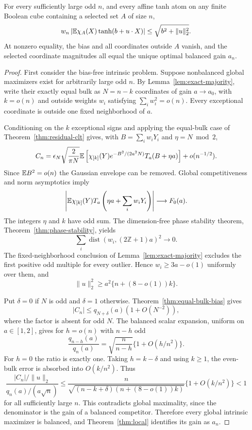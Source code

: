 \begin{theorem}
\label{thm:global-single-parity}
For every sufficiently large odd $n$, and every affine tanh atom on
any finite Boolean cube containing a selected set $A$ of size $n$,
\[
 w_n\left|\mathbb E\chi_A(X)\tanh(b+u\cdot X)\right|
 \le\sqrt{b^2+\|u\|_2^2}.
\]
At nonzero equality, the bias and all coordinates outside $A$ vanish,
and the selected coordinate magnitudes all equal the unique optimal
balanced gain $a_n$.
\end{theorem}
\begin{proof}
First consider the bias-free intrinsic problem. Suppose nonbalanced
global maximizers exist for arbitrarily large odd $n$. By
Lemma~\ref{lem:exact-majority}, write their exactly equal bulk as
$N=n-k$ coordinates of gain $a\to a_0$, with $k=o(n)$ and outside
weights $w_i$ satisfying $\sum_iw_i^2=o(n)$. Every exceptional
coordinate is outside one fixed neighborhood of $a$.

Conditioning on the $k$ exceptional signs and applying the equal-bulk
case of Theorem~\ref{thm:residual-clt} gives, with
$B=\sum_iw_iY_i$ and $\eta=N\bmod2$,
\[
 C_n=\epsilon_N\sqrt{\frac2{\pi N}}
 \mathbb E\left[\chi_{[k]}(Y)e^{-B^2/(2a^2N)}T_a(B+\eta a)\right]
 +o(n^{-1/2}).
\]
Since $\mathbb E B^2=o(n)$ the Gaussian envelope can be removed. Global
competitiveness and norm asymptotics imply
\[
 \left|\mathbb E\chi_{[k]}(Y)T_a\left(\eta a+\sum_iw_iY_i\right)\right|
 \longrightarrow F_0(a).
\]
The integers $\eta$ and $k$ have odd sum. The dimension-free phase
stability theorem, Theorem~\ref{thm:phase-stability}, yields
\[
 \sum_i\operatorname{dist}(w_i,(2\mathbb Z+1)a)^2\longrightarrow0.
\]
The fixed-neighborhood conclusion of Lemma~\ref{lem:exact-majority}
excludes the first positive odd multiple for every outlier. Hence
$w_i\ge3a-o(1)$ uniformly over them, and
\begin{equation}\label{eq:exception-norm-inflation}
 \|u\|_2^2\ge a^2\{n+(8-o(1))k\}.
\end{equation}

Put $\delta=0$ if $N$ is odd and $\delta=1$ otherwise.
Theorem~\ref{thm:equal-bulk-bias} gives
\[
 |C_n|\le q_{N+\delta}(a)(1+O(N^{-2})),
\]
where the factor is absent for odd $N$. The balanced scalar expansion,
uniform on $a\in[1,2]$, gives for $h=o(n)$ with $n-h$ odd
\[
 \frac{q_{n-h}(a)}{q_n(a)}
 =\sqrt{\frac n{n-h}}\{1+O(h/n^2)\}.
\]
For $h=0$ the ratio is exactly one. Taking $h=k-\delta$ and using
$k\ge1$, the even-bulk error is absorbed into $O(k/n^2)$. Thus
\[
 \frac{|C_n|/\|u\|_2}{q_n(a)/(a\sqrt n)}
 \le\frac{n}{\sqrt{(n-k+\delta)(n+(8-o(1))k)}}
       \{1+O(k/n^2)\}<1
\]
for all sufficiently large $n$. This contradicts global maximality,
since the denominator is the gain of a balanced competitor. Therefore
every global intrinsic maximizer is balanced, and
Theorem~\ref{thm:local} identifies its gain as $a_n$.


\end{proof}
